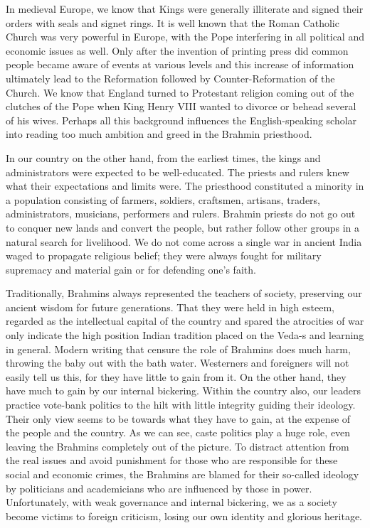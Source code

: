 In medieval Europe, we know that Kings were generally illiterate and signed their orders with seals and signet rings. It is well known that the Roman Catholic Church was very powerful in Europe, with the Pope interfering in all political and economic issues as well. Only after the invention of printing press did common people became aware of events at various levels and this increase of information ultimately lead to the Reformation followed by Counter-Reformation of the Church. We know that England turned to Protestant religion coming out of the clutches of the Pope when King Henry VIII wanted to divorce or behead several of his wives. Perhaps all this background influences the English-speaking scholar into reading too much ambition and greed in the Brahmin priesthood.

In our country on the other hand, from the earliest times, the kings and administrators were expected to be well-educated. The priests and rulers knew what their expectations and limits were. The priesthood constituted a minority in a population consisting of farmers, soldiers, craftsmen, artisans, traders, administrators, musicians, performers and rulers. Brahmin priests do not go out to conquer new lands and convert the people, but rather follow other groups in a natural search for livelihood. We do not come across a single war in ancient India waged to propagate religious belief; they were always fought for military supremacy and material gain or for defending one’s faith.

Traditionally, Brahmins always represented the teachers of society, preserving our ancient wisdom for future generations. That they were held in high esteem, regarded as the intellectual capital of the country and spared the atrocities of war only indicate the high position Indian tradition placed on the Veda-s and learning in general. Modern writing that censure the role of Brahmins does much harm, throwing the baby out with the bath water. Westerners and foreigners will not easily tell us this, for they have little to gain from it. On the other hand, they have much to gain by our internal bickering. Within the country also, our leaders practice vote-bank politics to the hilt with little integrity guiding their ideology. Their only view seems to be towards what they have to gain, at the expense of the people and the country. As we can see, caste politics play a huge role, even leaving the Brahmins completely out of the picture. To distract attention from the real issues and avoid punishment for those who are responsible for these social and economic crimes, the Brahmins are blamed for their so-called ideology by politicians and academicians who are influenced by those in power. Unfortunately, with weak governance and internal bickering, we as a society become victims to foreign criticism, losing our own identity and glorious heritage.


